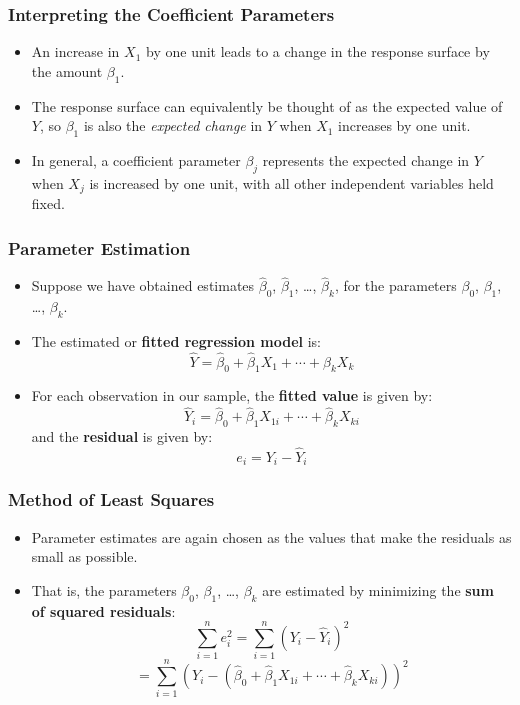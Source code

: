\documentclass[14pt]{beamer}
\begin{document}
\begin{frame}
	\frametitle{Interpreting the Coefficient Parameters}
	
	\begin{itemize}[label={\color{blue}$\blacktriangleright$}]
		\item An increase in $X_1$ by one unit leads to a change in the response surface by the amount $\beta_1$.
		
		\item The response surface can equivalently be thought of as the expected value of $Y$, so $\beta_1$ is also the \textit{expected change} in $Y$ when $X_1$ increases by one unit.
		
		\item In general, a coefficient parameter $\beta_j$ represents the expected change in $Y$ when $X_j$ is increased by one unit, with all other independent variables held fixed.
		
	\end{itemize}
	
\end{frame}
\begin{frame}
	\frametitle{Parameter Estimation}
	
	\begin{itemize}[label={\color{blue}$\blacktriangleright$}]
		\item Suppose we have obtained estimates $\hat{\beta}_0$, $\hat{\beta}_1$, \ldots, $\hat{\beta}_k$, for the parameters $\beta_0$, $\beta_1$, \ldots, $\beta_k$.
		
		\item The estimated or \textbf{fitted regression model} is:
		\[
		\hat{Y} = \hat{\beta}_0 + \hat{\beta}_1X_1 + \cdots + \hat{\beta}_kX_k
		\]
		
		\item For each observation in our sample, the \textbf{fitted value} is given by:
		\[
		\hat{Y}_i = \hat{\beta}_0 + \hat{\beta}_1X_{1i} + \cdots + \hat{\beta}_kX_{ki}
		\]
		and the \textbf{residual} is given by:
		\[
		e_i = Y_i - \hat{Y}_i
		\]
		
	\end{itemize}
	
\end{frame}
\begin{frame}
	\frametitle{Method of Least Squares}
	
	\begin{itemize}[label={\color{blue}$\blacktriangleright$}]
		\item Parameter estimates are again chosen as the values that make the residuals as small as possible.
		
		\item That is, the parameters $\beta_0$, $\beta_1$, \ldots, $\beta_k$ are estimated by minimizing the \textbf{sum of squared residuals}:
		\[
		\sum_{i=1}^n e_i^2 = \sum_{i=1}^n \left(Y_i - \hat{Y}_i\right)^2
		\]
		\[
		= \sum_{i=1}^n \left(Y_i - \left(\hat{\beta}_0 + \hat{\beta}_1X_{1i} + \cdots + \hat{\beta}_kX_{ki}\right)\right)^2
		\]
		
	\end{itemize}
	
\end{frame}
\end{document}
